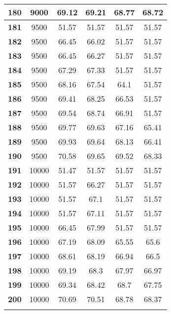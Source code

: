 \begin{longtable}{|c|c|c|c|c|c|}
\textbf{180} & 9000 & 69.12 & 69.21 & 68.77 & 68.72 \\ \hline 
\textbf{181} & 9500 & 51.57 & 51.57 & 51.57 & 51.57 \\ \hline 
\textbf{182} & 9500 & 66.45 & 66.02 & 51.57 & 51.57 \\ \hline 
\textbf{183} & 9500 & 66.45 & 66.27 & 51.57 & 51.57 \\ \hline 
\textbf{184} & 9500 & 67.29 & 67.33 & 51.57 & 51.57 \\ \hline 
\textbf{185} & 9500 & 68.16 & 67.54 & 64.1 & 51.57 \\ \hline 
\textbf{186} & 9500 & 69.41 & 68.25 & 66.53 & 51.57 \\ \hline 
\textbf{187} & 9500 & 69.54 & 68.74 & 66.91 & 51.57 \\ \hline 
\textbf{188} & 9500 & 69.77 & 69.63 & 67.16 & 65.41 \\ \hline 
\textbf{189} & 9500 & 69.93 & 69.64 & 68.13 & 66.41 \\ \hline 
\textbf{190} & 9500 & 70.58 & 69.65 & 69.52 & 68.33 \\ \hline 
\textbf{191} & 10000 & 51.47 & 51.57 & 51.57 & 51.57 \\ \hline 
\textbf{192} & 10000 & 51.57 & 66.27 & 51.57 & 51.57 \\ \hline 
\textbf{193} & 10000 & 51.57 & 67.1 & 51.57 & 51.57 \\ \hline 
\textbf{194} & 10000 & 51.57 & 67.11 & 51.57 & 51.57 \\ \hline 
\textbf{195} & 10000 & 66.45 & 67.99 & 51.57 & 51.57 \\ \hline 
\textbf{196} & 10000 & 67.19 & 68.09 & 65.55 & 65.6 \\ \hline 
\textbf{197} & 10000 & 68.61 & 68.19 & 66.94 & 66.5 \\ \hline 
\textbf{198} & 10000 & 69.19 & 68.3 & 67.97 & 66.97 \\ \hline 
\textbf{199} & 10000 & 69.34 & 68.42 & 68.7 & 67.75 \\ \hline 
\textbf{200} & 10000 & 70.69 & 70.51 & 68.78 & 68.37 \\ \hline 

    \caption[]{}
    \label{Tab:}
\end{longtable}